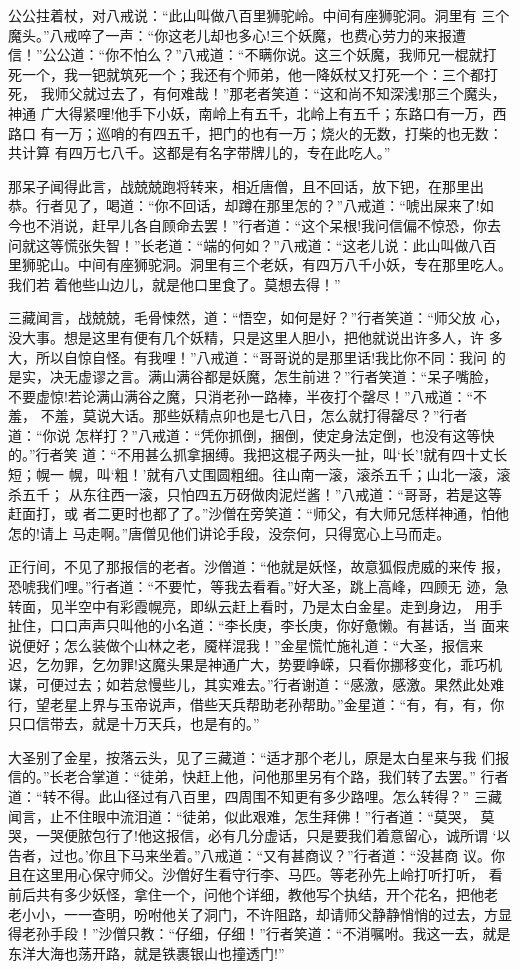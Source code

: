 公公拄着杖，对八戒说：“此山叫做八百里狮驼岭。中间有座狮驼洞。洞里有
三个魔头。”八戒啐了一声：“你这老儿却也多心!三个妖魔，也费心劳力的来报遭
信！”公公道：“你不怕么？”八戒道：“不瞒你说。这三个妖魔，我师兄一棍就打
死一个，我一钯就筑死一个；我还有个师弟，他一降妖杖又打死一个：三个都打死，
我师父就过去了，有何难哉！”那老者笑道：“这和尚不知深浅!那三个魔头，神通
广大得紧哩!他手下小妖，南岭上有五千，北岭上有五千；东路口有一万，西路口
有一万；巡哨的有四五千，把门的也有一万；烧火的无数，打柴的也无数：共计算
有四万七八千。这都是有名字带牌儿的，专在此吃人。”

那呆子闻得此言，战兢兢跑将转来，相近唐僧，且不回话，放下钯，在那里出
恭。行者见了，喝道：“你不回话，却蹲在那里怎的？”八戒道：“唬出屎来了!如
今也不消说，赶早儿各自顾命去罢！”行者道：“这个呆根!我问信偏不惊恐，你去
问就这等慌张失智！”长老道：“端的何如？”八戒道：“这老儿说：此山叫做八百
里狮驼山。中间有座狮驼洞。洞里有三个老妖，有四万八千小妖，专在那里吃人。
我们若着他些山边儿，就是他口里食了。莫想去得！”

三藏闻言，战兢兢，毛骨悚然，道：“悟空，如何是好？”行者笑道：“师父放
心，没大事。想是这里有便有几个妖精，只是这里人胆小，把他就说出许多人，许
多大，所以自惊自怪。有我哩！”八戒道：“哥哥说的是那里话!我比你不同：我问
的是实，决无虚谬之言。满山满谷都是妖魔，怎生前进？”行者笑道：“呆子嘴脸，
不要虚惊!若论满山满谷之魔，只消老孙一路棒，半夜打个罄尽！”八戒道：“不羞，
不羞，莫说大话。那些妖精点卯也是七八日，怎么就打得罄尽？”行者道：“你说
怎样打？”八戒道：“凭你抓倒，捆倒，使定身法定倒，也没有这等快的。”行者笑
道：“不用甚么抓拿捆缚。我把这棍子两头一扯，叫‘长’!就有四十丈长短；幌一
幌，叫‘粗！’就有八丈围圆粗细。往山南一滚，滚杀五千；山北一滚，滚杀五千；
从东往西一滚，只怕四五万砑做肉泥烂酱！”八戒道：“哥哥，若是这等赶面打，或
者二更时也都了了。”沙僧在旁笑道：“师父，有大师兄恁样神通，怕他怎的!请上
马走啊。”唐僧见他们讲论手段，没奈何，只得宽心上马而走。

正行间，不见了那报信的老者。沙僧道：“他就是妖怪，故意狐假虎威的来传
报，恐唬我们哩。”行者道：“不要忙，等我去看看。”好大圣，跳上高峰，四顾无
迹，急转面，见半空中有彩霞幌亮，即纵云赶上看时，乃是太白金星。走到身边，
用手扯住，口口声声只叫他的小名道：“李长庚，李长庚，你好惫懒。有甚话，当
面来说便好；怎么装做个山林之老，魇样混我！”金星慌忙施礼道：“大圣，报信来
迟，乞勿罪，乞勿罪!这魔头果是神通广大，势要峥嵘，只看你挪移变化，乖巧机
谋，可便过去；如若怠慢些儿，其实难去。”行者谢道：“感激，感激。果然此处难
行，望老星上界与玉帝说声，借些天兵帮助老孙帮助。”金星道：“有，有，有，你
只口信带去，就是十万天兵，也是有的。”

大圣别了金星，按落云头，见了三藏道：“适才那个老儿，原是太白星来与我
们报信的。”长老合掌道：“徒弟，快赶上他，问他那里另有个路，我们转了去罢。”
行者道：“转不得。此山径过有八百里，四周围不知更有多少路哩。怎么转得？”
三藏闻言，止不住眼中流泪道：“徒弟，似此艰难，怎生拜佛！”行者道：“莫哭，
莫哭，一哭便脓包行了!他这报信，必有几分虚话，只是要我们着意留心，诚所谓
‘以告者，过也。’你且下马来坐着。”八戒道：“又有甚商议？”行者道：“没甚商
议。你且在这里用心保守师父。沙僧好生看守行李、马匹。等老孙先上岭打听打听，
看前后共有多少妖怪，拿住一个，问他个详细，教他写个执结，开个花名，把他老
老小小，一一查明，吩咐他关了洞门，不许阻路，却请师父静静悄悄的过去，方显
得老孙手段！”沙僧只教：“仔细，仔细！”行者笑道：“不消嘱咐。我这一去，就是
东洋大海也荡开路，就是铁裹银山也撞透门!”

